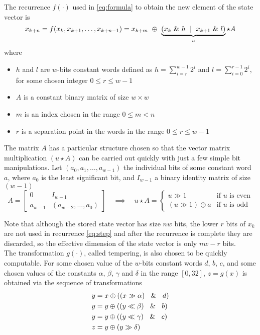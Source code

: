 \documentclass[preprint,1p,times]{elsarticle}
\begin{document}
	The recurrence $f(\cdot)$ used in \eqref{eq:formula} to obtain the new element of the state vector is
	\begin{equation}
		\label{eq:step}
		x_{k+n} = f(x_{k},x_{k+1}, \dots, x_{k+n-1}) = x_{k+m} ~\mathbin{\oplus} ~\underbrace{\left({x_k}~\&~h ~\mid~ x_{k+1}~\&~l\right) }_u \star A 
	\end{equation}
	where
	\begin{itemize}
		\item $h$ and $l$ are $w$-bits constant words defined as $h=\sum_{i=r}^{w-1}2^i$ and $l=\sum_{i=0}^{r-1}2^i$, for some chosen integer $0 \le r \le w-1$ 
		\item $A$ is a constant binary matrix of size $w \times w$
		\item $m$ is an index chosen in the range $0 \le m < n$
		\item $r$ is a separation point in the words in the range $0 \le r \le w-1$
	\end{itemize}
	
	The matrix $A$ has a particular structure chosen so that the vector matrix multiplication $(u\star A)$ can be carried out quickly with just a few simple bit manipulations. Let $(a_0, a_1, \dots, a_{w-1})$ the individual bits of some constant word $a$, where $a_0$ is the least significant bit, and $I_{w-1}$ a binary identity matrix of size $(w-1)$
	\begin{equation}
		\label{eq:matmult}
		A = \left[ \begin{matrix} 0 & I_{w - 1} \\ a_{w-1} & (a_{w - 2}, \ldots , a_0) \end{matrix} \right] \quad \implies \quad u\star A = \begin{cases}u \gg 1 & \text{if $u$ is even}\\(u \gg 1) \oplus a & \text{if $u$ is odd}\end{cases}
	\end{equation}
	
	Note that although the stored state vector has size $nw$ bits, the lower $r$ bits of $x_k$ are not used in recurrence \eqref{eq:step} and after the recurrence is complete they are discarded, so the effective dimension of the state vector is only $nw-r$ bits. \\ %
	
	The transformation $g(\cdot)$, called tempering, is also chosen to be quickly computable. For some chosen value of the $w$-bits constant words $d$, $b$, $c$, and some chosen values of the constants $\alpha$, $\beta$, $\gamma$ and $\delta$ in the range $[0,32]$, $z=g(x)$ is obtained via the sequence of transformations
	\begin{equation}
		\label{eq:tempering}
		\begin{aligned}
			y &= x \oplus ((x\gg \alpha)~\And~d)\\
			y &= y \oplus ((y\ll \beta)~\And~b)\\
			y &= y \oplus ((y\ll \gamma)~\And~c)\\
			z &= y \oplus (y\gg \delta)
		\end{aligned}
	\end{equation}
	
\end{document}
